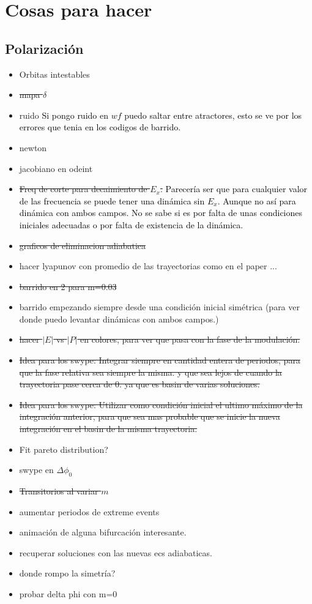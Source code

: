 \section{Cosas para hacer}

	\subsection{Polarización}
					
		\begin{itemize}
			\color{red}	
			\item Orbitas intestables
			\item \st{mapa $\delta$}
			\item ruido \textcolor{black}{Si pongo ruido en $wf$ puedo saltar entre atractores, esto se ve por los errores que tenia en los codigos de barrido.}
			\item newton
			\item jacobiano en odeint
			\item \st{Freq de corte para decaimiento de $E_x$.}
			\textcolor{black}{Parecería ser que para cualquier valor de las frecuencia se puede tener una dinámica sin $E_x$. Aunque no así para dinámica con ambos campos. No se sabe si es por falta de unas condiciones iniciales adecuadas o por falta de existencia de la dinámica.}
			\item \st{graficos de eliminacion adiabatica}
			\item hacer lyapunov con promedio de las trayectorias como en el paper ...
			\item \st{barrido en 2 para m=0.03}
			\item barrido empezando siempre desde una condición inicial simétrica (para ver donde puedo levantar dinámicas con ambos campos.)
			\item \st{ hacer $|E|$ vs $|P|$ en colores, para ver que pasa con la fase de la modulación.}
			\item \st{Idea para los swype: Integrar siempre en cantidad entera de periodos, para que la fase relativa sea siempre la misma. y que sea lejos de cuando la trayectoria pase cerca de 0. ya que es basin de varias soluciones.}
			\item \st{Idea para los swype: Utilizar como condición inicial el ultimo máximo de la integración anterior, para que sea mas probable que se inicie la nueva integración en el basin de la misma trayectoria.}
			\item Fit pareto distribution?	
			\item swype en $\Delta \phi_0$
			\item \st{Transitorios al variar $m$}
			\item aumentar periodos de extreme events	
			\item animación de alguna bifurcación interesante.	
			\item recuperar soluciones con las nuevas ecs adiabaticas.
			\item donde rompo la simetría?		
			\item probar delta phi con m=0
		\end{itemize}

